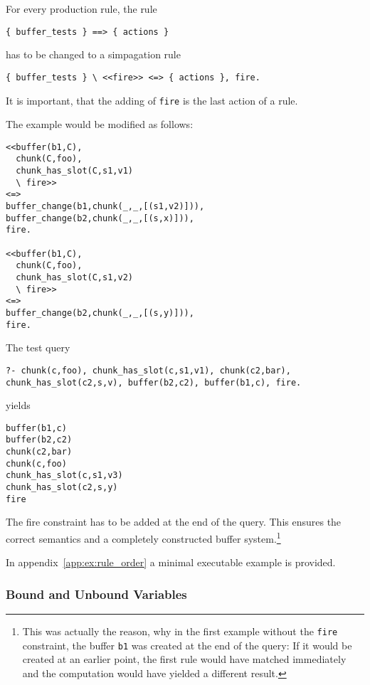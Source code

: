 For every production rule, the rule

\begin{lstlisting}
{ buffer_tests } ==> { actions }
\end{lstlisting}

has to be changed to a simpagation rule

\begin{lstlisting}
{ buffer_tests } \ <<fire>> <=> { actions }, fire.
\end{lstlisting}

It is important, that the adding of \lstinline|fire| is the last action of a rule.

The example would be modified as follows:

\begin{lstlisting}
<<buffer(b1,C),
  chunk(C,foo),
  chunk_has_slot(C,s1,v1)
  \ fire>>
<=>
buffer_change(b1,chunk(_,_,[(s1,v2)])),
buffer_change(b2,chunk(_,_,[(s,x)])),
fire.

<<buffer(b1,C),
  chunk(C,foo),
  chunk_has_slot(C,s1,v2)
  \ fire>>
<=>
buffer_change(b2,chunk(_,_,[(s,y)])),
fire.
\end{lstlisting}


The test query

\begin{lstlisting}
?- chunk(c,foo), chunk_has_slot(c,s1,v1), chunk(c2,bar), chunk_has_slot(c2,s,v), buffer(b2,c2), buffer(b1,c), fire.
\end{lstlisting}

yields

\begin{lstlisting}
buffer(b1,c)
buffer(b2,c2)
chunk(c2,bar)
chunk(c,foo)
chunk_has_slot(c,s1,v3)
chunk_has_slot(c2,s,y)
fire
\end{lstlisting}

The fire constraint has to be added at the end of the query. This ensures the correct semantics and a completely constructed buffer system.\footnote{This was actually the reason, why in the first example without the \texttt{fire} constraint, the buffer \texttt{b1} was created at the end of the query: If it would be created at an earlier point, the first rule would have matched immediately and the computation would have yielded a different result.}

In appendix~\ref{app:ex:rule_order} a minimal executable example is provided.

\subsubsection{Bound and Unbound Variables}
\label{bound_and_unbound_variables}

